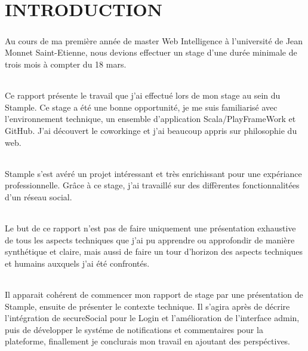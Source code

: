\chapter{INTRODUCTION}
\paragraph{}
Au cours de ma première année de master Web Intelligence à l'université de Jean Monnet Saint-Etienne, nous devions effectuer un stage d'une durée minimale de trois mois à compter du 18 mars.
\subparagraph{}
Ce rapport présente le travail que j'ai effectué lors de mon stage au sein du Stample.
\newline
Ce stage a été une bonne opportunité, je me suis familiarisé avec l'environnement technique, un ensemble d'application Scala/PlayFrameWork et GitHub.
J'ai découvert le coworkinge et j'ai beaucoup appris sur philosophie du web.
\subparagraph{}
Stample s'est avéré un projet intéressant et très enrichissant pour une expériance professionnelle. Gr\^ace à ce stage, j'ai travaillé sur des diffèrentes fonctionnalitées d'un réseau social.
\subparagraph{}
Le but de ce rapport n’est pas de faire uniquement une présentation exhaustive de tous les aspects techniques que j’ai pu apprendre ou approfondir de manière synthétique et claire, mais aussi de faire un tour d’horizon des aspects techniques et humains auxquels j’ai été confrontés.
\subparagraph{}
Il apparait cohérent de commencer mon rapport de stage par une présentation de Stample, ensuite de présenter le contexte technique. Il s’agira après de décrire l'intégration de secureSocial pour le Login et l'amélioration de l'interface admin, puis de développer le systéme de notifications et commentaires pour la plateforme, finallement je conclurais mon travail en ajoutant des perspéctives.
\newpage